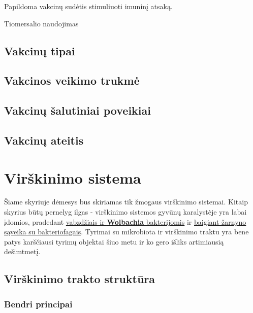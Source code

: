 \documentclass[]{book}
\begin{document}
Papildoma vakcinų sudėtis stimuliuoti imuninį atsaką.

Tiomersalio naudojimas

\hypertarget{vakcinu-tipai}{%
\section{Vakcinų tipai}\label{vakcinu-tipai}}

\hypertarget{vakcinos-veikimo-trukme}{%
\section{Vakcinos veikimo trukmė}\label{vakcinos-veikimo-trukme}}

\hypertarget{vakcinu-salutiniai-poveikiai}{%
\section{Vakcinų šalutiniai poveikiai}\label{vakcinu-salutiniai-poveikiai}}

\hypertarget{vakcinu-ateitis}{%
\section{Vakcinų ateitis}\label{vakcinu-ateitis}}

\hypertarget{virskinimo-sistema}{%
\chapter{Virškinimo sistema}\label{virskinimo-sistema}}

Šiame skyriuje dėmesys bus skiriamas tik žmogaus virškinimo sistemai. Kitaip skyrius būtų pernelyg ilgas - virškinimo sistemos gyvūnų karalystėje yra labai įdomios, pradedant \href{https://www.ncbi.nlm.nih.gov/pmc/articles/PMC3873267/}{vabzdžiais ir \textbf{Wolbachia} bakterijomis} ir \href{https://www.ncbi.nlm.nih.gov/pmc/articles/PMC5553654/}{baigiant žarnyno sąveika su bakteriofagais}. Tyrimai su mikrobiota ir virškinimo traktu yra bene patys karščiausi tyrimų objektai šiuo metu ir ko gero išliks artimiausią dešimtmetį.

\hypertarget{virskinimo-trakto-struktura}{%
\section{Virškinimo trakto struktūra}\label{virskinimo-trakto-struktura}}

\hypertarget{bendri-principai}{%
\subsection{Bendri principai}\label{bendri-principai}}
\end{document}
